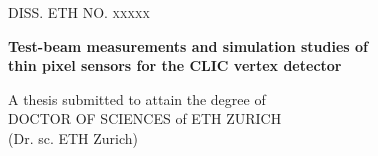 
\begin{titlepage}

\newcommand{\HRule}{\rule{\linewidth}{0.5mm}} %

\center %
 

\textsc{\LARGE DISS. ETH NO. xxxxx}\\[1.5cm] %

\vspace{2cm}

{ \huge \bfseries Test-beam measurements and simulation studies
  of}\\%
\vspace{0.2cm} { \huge \bfseries thin pixel sensors for the CLIC vertex
  detector}\\[0.4cm] %
\vspace{2cm}

{\large A thesis submitted to attain the degree of} \\ \vspace{0.5cm}
{\Large DOCTOR OF SCIENCES of ETH ZURICH}\\ \vspace{0.3cm}
{\Large (Dr. sc. ETH Zurich)} \vspace{1.5cm}



\end{titlepage}
